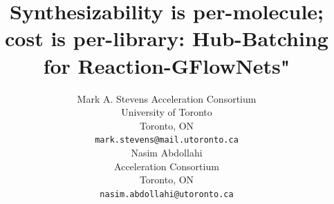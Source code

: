 \documentclass{article}
\title{Synthesizability is per-molecule; cost is per-library: Hub-Batching for Reaction-GFlowNets"}
\author{%
  Mark A. Stevens
  Acceleration Consortium\\
  University of Toronto\\
  Toronto, ON \\
  \texttt{mark.stevens@mail.utoronto.ca} \\
  \And
  Nasim Abdollahi \\
  Acceleration Consortium \\
  Toronto, ON \\
  \texttt{nasim.abdollahi@utoronto.ca} \\
}
\newcommand{\checkval}[1]{\textcolor{blue}{#1}}
\begin{document}
\maketitle

\begin{abstract}
%

\end{abstract}
\end{document}
